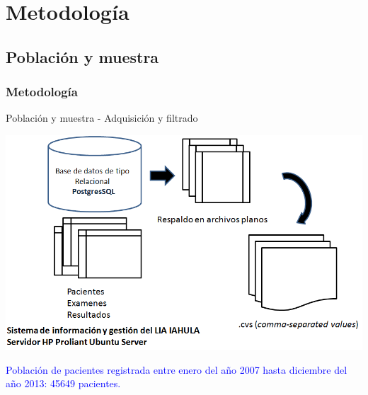 \documentclass{beamer}%
\begin{document}
\section{Metodolog\'ia}
\subsection{Poblaci\'on y muestra}

\begin{frame}
\frametitle{\textbf\textbf{Metodolog\'ia}}
\begin{block}{Poblaci\'on y muestra - Adquisici\'on y filtrado}
\end{block}
\begin{center}\includegraphics[height=0.5\textheight]{PM.PNG}\end{center}
\tiny{\textcolor{blue}{Poblaci\'on de pacientes registrada entre enero del a\~no 2007  hasta diciembre del a\~no 2013:  45649 pacientes.}}
\end{frame}
\end{document}
